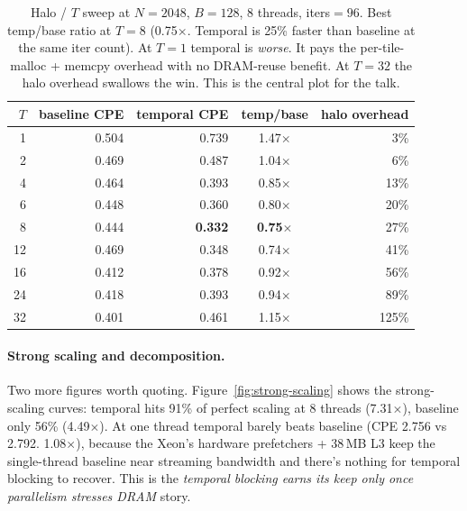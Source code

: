 \documentclass[11pt]{article}
\begin{document}
\begin{table}[h!]
\centering
\renewcommand{\arraystretch}{1.1}
\begin{tabular}{rrrcr}
\toprule
$T$ & baseline CPE & temporal CPE & temp/base & halo overhead \\
\midrule
 1 & 0.504 & 0.739 & 1.47$\times$ &   3\% \\
 2 & 0.469 & 0.487 & 1.04$\times$ &   6\% \\
 4 & 0.464 & 0.393 & 0.85$\times$ &  13\% \\
 6 & 0.448 & 0.360 & 0.80$\times$ &  20\% \\
 8 & 0.444 & \textbf{0.332} & \textbf{0.75$\times$} & 27\% \\
12 & 0.469 & 0.348 & 0.74$\times$ &  41\% \\
16 & 0.412 & 0.378 & 0.92$\times$ &  56\% \\
24 & 0.418 & 0.393 & 0.94$\times$ &  89\% \\
32 & 0.401 & 0.461 & 1.15$\times$ & 125\% \\
\bottomrule
\end{tabular}
\caption{Halo / $T$ sweep at $N{=}2048$, $B{=}128$, 8 threads,
iters$=96$.  Best temp/base ratio at $T{=}8$ (0.75$\times$. Temporal
is 25\% faster than baseline at the same iter count).  At $T{=}1$
temporal is \emph{worse}. It pays the per-tile-malloc + memcpy
overhead with no DRAM-reuse benefit.  At $T{=}32$ the halo overhead
swallows the win.  This is the central plot for the talk.}
\label{tab:t-sweep}
\end{table}

\paragraph{Strong scaling and decomposition.}  Two more figures
worth quoting.  Figure~\ref{fig:strong-scaling} shows the strong-
scaling curves: temporal hits 91\% of perfect scaling at 8 threads
(7.31$\times$), baseline only 56\% (4.49$\times$).  At one thread
temporal barely beats baseline (CPE 2.756 vs 2.792. 1.08$\times$),
because the Xeon's hardware prefetchers + 38\,MB L3 keep the
single-thread baseline near streaming bandwidth and there's nothing
for temporal blocking to recover.  This is the \emph{temporal
blocking earns its keep only once parallelism stresses DRAM} story.
\end{document}

